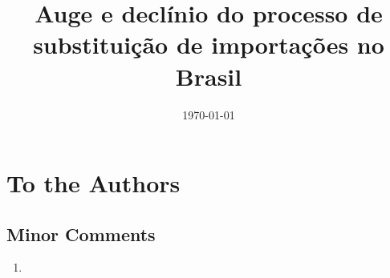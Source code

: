 \documentclass[12pt,twoside]{article}
\title{Auge e declínio do processo de substituição de importações no Brasil}
\author[1]{\referee}
\date{\today}
\begin{document}
\maketitle

\begin{lettereditor}
  \lipsum[1-5] %
\end{lettereditor}

\newpage

\section{To the Authors}
\lipsum[6-7] %
\subsection{Minor Comments}
\begin{enumerate}[label = (\roman*)]
  \item \lipsum[8]
\end{enumerate}
\end{document}
